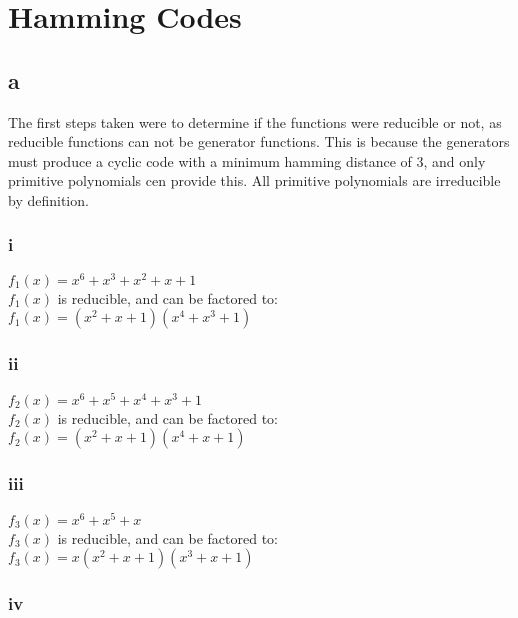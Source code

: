 \section{Hamming Codes}

\subsection{a}
\label{sec:2a}
The first steps taken were to determine if the functions were reducible or not, as reducible functions can not be generator functions.
This is because the generators must produce a cyclic code with a minimum hamming distance of 3, and only primitive polynomials cen provide this.
All primitive polynomials are irreducible by definition.

\subsubsection{i}

$f_{1}(x) = x^{6} + x^{3} + x^{2} + x + 1$ \\

\noindent $f_{1}(x)$ is reducible, and can be factored to: \\

\noindent $f_{1}(x) = (x^{2} + x + 1)(x^{4} + x^{3} + 1)$

\subsubsection{ii}

$f_{2}(x) = x^{6} + x^{5} + x^{4} + x^{3} + 1$ \\

\noindent $f_{2}(x)$ is reducible, and can be factored to: \\

\noindent $f_{2}(x) = (x^{2} + x + 1)(x^{4} + x + 1)$

\subsubsection{iii}

$f_{3}(x) = x^{6} + x^{5} + x$ \\

\noindent $f_{3}(x)$ is reducible, and can be factored to: \\

\noindent $f_{3}(x) = x(x^{2} + x + 1)(x^{3} + x + 1)$

\subsubsection{iv}

